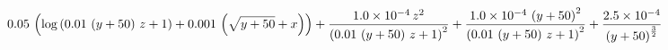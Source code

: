 $$0.05\,\left(\log \left(0.01\,\left(y+50\right)\,z+1\right)+0.001\,
 \left(\sqrt{y+50}+x\right)\right)+{{1.0 \times 10^{-4}\,z^2}\over{
 \left(0.01\,\left(y+50\right)\,z+1\right)^2}}+{{1.0 \times 10^{-4}\,
 \left(y+50\right)^2}\over{\left(0.01\,\left(y+50\right)\,z+1\right)^
 2}}+{{2.5 \times 10^{-4}}\over{\left(y+50\right)^{{{3}\over{2}}}}}$$
